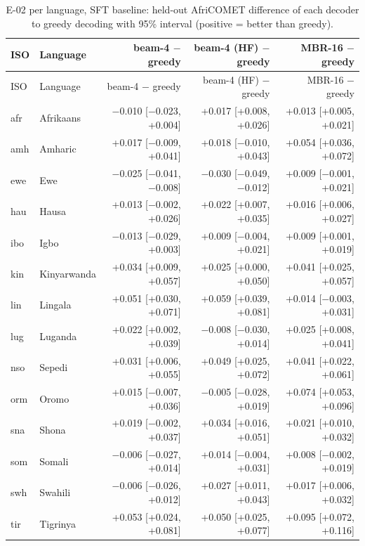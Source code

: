 {\scriptsize\setlength{\tabcolsep}{1.5pt}
\begin{longtable}{@{}llrrr@{}}
\caption{E-02 per language, SFT baseline: held-out AfriCOMET difference of each decoder to greedy decoding with 95\% interval (positive = better than greedy).}\label{tab:dec-d-sft-c}\\
\toprule
ISO & Language & beam-4 $-$ greedy & beam-4 (HF) $-$ greedy & MBR-16 $-$ greedy \\
\midrule\endfirsthead
\toprule
ISO & Language & beam-4 $-$ greedy & beam-4 (HF) $-$ greedy & MBR-16 $-$ greedy \\
\midrule\endhead
\midrule\endfoot
\bottomrule\endlastfoot
afr & Afrikaans & $-$0.010 [$-$0.023, +0.004] & +0.017 [+0.008, +0.026] & +0.013 [+0.005, +0.021] \\
amh & Amharic & +0.017 [$-$0.009, +0.041] & +0.018 [$-$0.010, +0.043] & +0.054 [+0.036, +0.072] \\
ewe & Ewe & $-$0.025 [$-$0.041, $-$0.008] & $-$0.030 [$-$0.049, $-$0.012] & +0.009 [$-$0.001, +0.021] \\
hau & Hausa & +0.013 [$-$0.002, +0.026] & +0.022 [+0.007, +0.035] & +0.016 [+0.006, +0.027] \\
ibo & Igbo & $-$0.013 [$-$0.029, +0.003] & +0.009 [$-$0.004, +0.021] & +0.009 [+0.001, +0.019] \\
kin & Kinyarwanda & +0.034 [+0.009, +0.057] & +0.025 [+0.000, +0.050] & +0.041 [+0.025, +0.057] \\
lin & Lingala & +0.051 [+0.030, +0.071] & +0.059 [+0.039, +0.081] & +0.014 [$-$0.003, +0.031] \\
lug & Luganda & +0.022 [+0.002, +0.039] & $-$0.008 [$-$0.030, +0.014] & +0.025 [+0.008, +0.041] \\
nso & Sepedi & +0.031 [+0.006, +0.055] & +0.049 [+0.025, +0.072] & +0.041 [+0.022, +0.061] \\
orm & Oromo & +0.015 [$-$0.007, +0.036] & $-$0.005 [$-$0.028, +0.019] & +0.074 [+0.053, +0.096] \\
sna & Shona & +0.019 [$-$0.002, +0.037] & +0.034 [+0.016, +0.051] & +0.021 [+0.010, +0.032] \\
som & Somali & $-$0.006 [$-$0.027, +0.014] & +0.014 [$-$0.004, +0.031] & +0.008 [$-$0.002, +0.019] \\
swh & Swahili & $-$0.006 [$-$0.026, +0.012] & +0.027 [+0.011, +0.043] & +0.017 [+0.006, +0.032] \\
tir & Tigrinya & +0.053 [+0.024, +0.081] & +0.050 [+0.025, +0.077] & +0.095 [+0.072, +0.116] \\

\end{longtable}}
